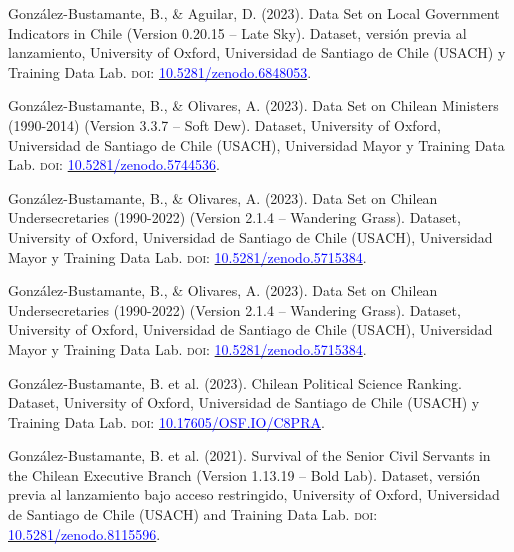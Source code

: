 \begin{publications}

\begin{benumerate}{6}

\item{González-Bustamante, B., \& Aguilar, D. (2023). Data Set on Local Government Indicators in Chile (Version 0.20.15 -- Late Sky). Dataset, versión previa al lanzamiento, University of Oxford, Universidad de Santiago de Chile (USACH) y Training Data Lab. {\scshape doi:} \href{https://doi.org/10.5281/zenodo.6848053}{\textcolor{blue}{10.5281/zenodo.6848053}}.}\vspace{1mm}

\item{González-Bustamante, B., \& Olivares, A. (2023). Data Set on Chilean Ministers (1990-2014) (Version 3.3.7 -- Soft Dew). Dataset, University of Oxford, Universidad de Santiago de Chile (USACH), Universidad Mayor y Training Data Lab. {\scshape doi:} \href{https://doi.org/10.5281/zenodo.5744536}{\textcolor{blue}{10.5281/zenodo.5744536}}.}\vspace{1mm}

\item{González-Bustamante, B., \& Olivares, A. (2023). Data Set on Chilean Undersecretaries (1990-2022) (Version 2.1.4 -- Wandering Grass). Dataset, University of Oxford, Universidad de Santiago de Chile (USACH), Universidad Mayor y Training Data Lab. {\scshape doi:} \href{https://doi.org/10.5281/zenodo.5715384}{\textcolor{blue}{10.5281/zenodo.5715384}}.}\vspace{1mm}

\item{González-Bustamante, B., \& Olivares, A. (2023). Data Set on Chilean Undersecretaries (1990-2022) (Version 2.1.4 -- Wandering Grass). Dataset, University of Oxford, Universidad de Santiago de Chile (USACH), Universidad Mayor y Training Data Lab. {\scshape doi:} \href{https://doi.org/10.5281/zenodo.5715384}{\textcolor{blue}{10.5281/zenodo.5715384}}.}\vspace{1mm}

\item{González-Bustamante, B. et al. (2023). Chilean Political Science Ranking. Dataset, University of Oxford, Universidad de Santiago de Chile (USACH) y Training Data Lab. {\scshape doi:} \href{http://doi.org/10.17605/OSF.IO/C8PRA}{\textcolor{blue}{10.17605/OSF.IO/C8PRA}}.}\vspace{1mm}

\item{González-Bustamante, B. et al. (2021). Survival of the Senior Civil Servants in the Chilean Executive Branch (Version 1.13.19 -- Bold Lab). Dataset, versión previa al lanzamiento bajo acceso restringido, University of Oxford, Universidad de Santiago de Chile (USACH) and Training Data Lab. {\scshape doi:} \href{https://doi.org/10.5281/zenodo.8115596}{\textcolor{blue}{10.5281/zenodo.8115596}}.}\vspace{1mm}

\end{benumerate}

\end{publications}

